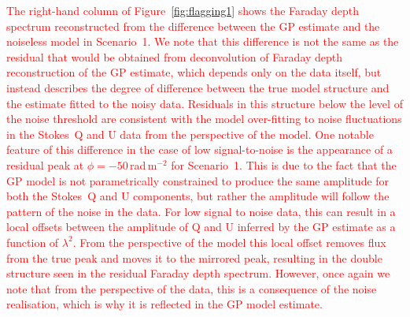 \documentclass[fleqn,usenatbib]{mnras}
\begin{document}
\textcolor{red}{The right-hand column of Figure~\ref{fig:flagging1} shows the  Faraday depth spectrum reconstructed from the difference between the GP estimate and the noiseless model in Scenario~1. We note that this difference is not the same as the residual that would be obtained from deconvolution of Faraday depth reconstruction of the GP estimate, which depends only on the data itself, but instead describes the degree of difference between the true model structure and the estimate fitted to the noisy data. Residuals in this structure below the level of the noise threshold are consistent with the model over-fitting to noise fluctuations in the Stokes~Q and U data from the perspective of the model. One notable feature of this difference in the case of low signal-to-noise is the appearance of a residual peak at $\phi = -50$\,rad\,m$^{-2}$ for Scenario~1. This is due to the fact that the GP model is not parametrically constrained to produce the same amplitude for both the Stokes~Q and U components, but rather the amplitude will follow the pattern of the noise in the data. For low signal to noise data, this can result in a local offsets between the amplitude of Q and U inferred by the GP estimate as a function of $\lambda^2$. From the perspective of the model this local offset removes flux from the true peak and moves it to the mirrored peak, resulting in the double structure seen in the residual Faraday depth spectrum. However, once again we note that from the perspective of the data, this is a consequence of the noise realisation, which is why it is reflected in the GP model estimate.}
\end{document}
